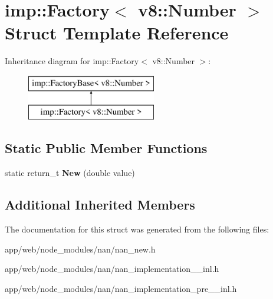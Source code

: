 \hypertarget{structimp_1_1_factory_3_01v8_1_1_number_01_4}{}\section{imp\+:\+:Factory$<$ v8\+:\+:Number $>$ Struct Template Reference}
\label{structimp_1_1_factory_3_01v8_1_1_number_01_4}
Inheritance diagram for imp\+:\+:Factory$<$ v8\+:\+:Number $>$\+:\begin{figure}[H]
\begin{center}
\leavevmode
\includegraphics[height=2.000000cm]{structimp_1_1_factory_3_01v8_1_1_number_01_4}
\end{center}
\end{figure}
\subsection*{Static Public Member Functions}
\begin{DoxyCompactItemize}
\item 
\mbox{\label{structimp_1_1_factory_3_01v8_1_1_number_01_4_abad2e49a5291a1c310d9a025b19033a4}} 
static return\+\_\+t {\bfseries New} (double value)
\end{DoxyCompactItemize}
\subsection*{Additional Inherited Members}


The documentation for this struct was generated from the following files\+:\begin{DoxyCompactItemize}
\item 
app/web/node\+\_\+modules/nan/nan\+\_\+new.\+h\item 
app/web/node\+\_\+modules/nan/nan\+\_\+implementation\+\_\+\_\+inl.\+h\item 
app/web/node\+\_\+modules/nan/nan\+\_\+implementation\+\_\+pre\+\_\+\_\+inl.\+h\end{DoxyCompactItemize}
